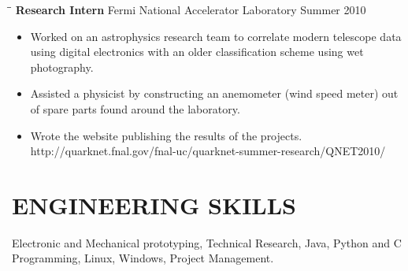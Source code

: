 \documentclass{res}
\begin{document}
\begin{resume}
   \begin{tabbing}
   \hspace{2.3in}\= \hspace{2.6in}\= \kill %
    {\bf Research Intern} \>Fermi National Accelerator Laboratory     \>Summer 2010\\
   \end{tabbing}\vspace{-20pt}      %
   \begin{itemize}
      \item Worked on an astrophysics research team to correlate modern telescope data using digital electronics with an older classification scheme using wet photography.
      \item Assisted a physicist by constructing an anemometer (wind speed meter) out of spare parts found around the laboratory.
      \item Wrote the website publishing the results of the projects.\\ http://quarknet.fnal.gov/fnal-uc/quarknet-summer-research/QNET2010/
   \end{itemize}



\section{ENGINEERING SKILLS}          
    Electronic and Mechanical prototyping, Technical Research, Java, Python and C Programming, Linux, Windows, Project Management.
 

\end{resume}
\end{document}
